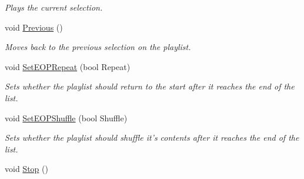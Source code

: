 \begin{DoxyCompactItemize}
\begin{DoxyCompactList}\small\item\em Plays the current selection. \item\end{DoxyCompactList}\item 
\hypertarget{classMezzanine_1_1Audio_1_1MusicPlayer_a0e4035b9649a41b5d6f37307e3e7d85a}{
void \hyperlink{classMezzanine_1_1Audio_1_1MusicPlayer_a0e4035b9649a41b5d6f37307e3e7d85a}{Previous} ()}
\label{classMezzanine_1_1Audio_1_1MusicPlayer_a0e4035b9649a41b5d6f37307e3e7d85a}

\begin{DoxyCompactList}\small\item\em Moves back to the previous selection on the playlist. \item\end{DoxyCompactList}\item 
void \hyperlink{classMezzanine_1_1Audio_1_1MusicPlayer_a74960a12f9a603714c3ea6ab239808e1}{SetEOPRepeat} (bool Repeat)
\begin{DoxyCompactList}\small\item\em Sets whether the playlist should return to the start after it reaches the end of the list. \item\end{DoxyCompactList}\item 
void \hyperlink{classMezzanine_1_1Audio_1_1MusicPlayer_a84ad5adcdc171ab16b16d41e8ae5d874}{SetEOPShuffle} (bool Shuffle)
\begin{DoxyCompactList}\small\item\em Sets whether the playlist should shuffle it's contents after it reaches the end of the list. \item\end{DoxyCompactList}\item 
\hypertarget{classMezzanine_1_1Audio_1_1MusicPlayer_a0657a9c4f5637ac1135c244384f8df9e}{
void \hyperlink{classMezzanine_1_1Audio_1_1MusicPlayer_a0657a9c4f5637ac1135c244384f8df9e}{Stop} ()}
\label{classMezzanine_1_1Audio_1_1MusicPlayer_a0657a9c4f5637ac1135c244384f8df9e}


\end{DoxyCompactItemize}
